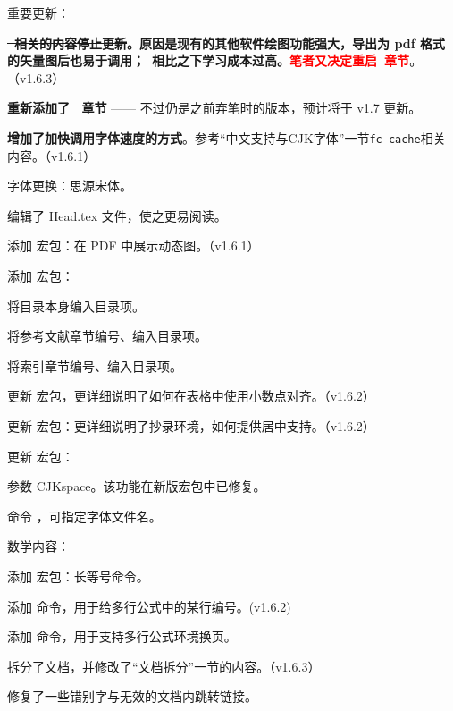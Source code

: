 \begin{feai}
\item 重要更新：
  \begin{feai}
  \item \textbf{\sout{\tikzz\  相关的内容停止更新}。原因是现有的其他软件绘图功能强大，导出为 pdf 格式的矢量图后也易于调用；\tikzz\  相比之下学习成本过高。}\textcolor{red}{\textbf{笔者又决定重启\tikzz\ 章节}}。（v1.6.3）
  \item \textbf{重新添加了 \tikzz\  章节} —— 不过仍是之前弃笔时的版本，预计将于 v1.7 更新。
  \item \textbf{增加了加快\xelatex 调用字体速度的方式}。参考“中文支持与CJK字体”一节\texttt{fc-cache}相关内容。（v1.6.1）
  \end{feai}
\item 字体更换：思源宋体。
\item 编辑了 Head.tex 文件，使之更易阅读。
\item [添加]宏包：在 PDF 中展示动态图。（v1.6.1）
\item [添加]宏包：
  \begin{feai}
  \item 将目录本身编入目录项。
  \item 将参考文献章节编号、编入目录项。
  \item 将索引章节编号、编入目录项。
  \end{feai}
\item [更新]宏包，更详细说明了如何在表格中使用小数点对齐。（v1.6.2）
\item [更新]宏包：更详细说明了抄录环境，如何提供居中支持。（v1.6.2）
\item [更新]宏包：
  \begin{feai}
  \item 参数 CJKspace。该功能在新版宏包中已修复。
  \item 命令 ，可指定字体文件名。
  \end{feai}
\item 数学内容：
  \begin{feai}
  \item [添加]宏包：长等号命令。
  \item [添加]命令，用于给多行公式中的某行编号。(v1.6.2)
  \item [添加]命令，用于支持多行公式环境换页。
  \end{feai}
\item 拆分了文档，并修改了“文档拆分”一节的内容。（v1.6.3）
\item 修复了一些错别字与无效的文档内跳转链接。
\end{feai}

